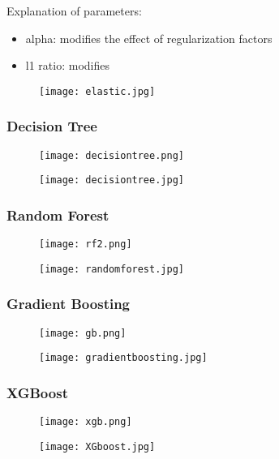 \documentclass[a4paper, 12pt]{article}
\begin{document}
Explanation of parameters:
\begin{itemize}
    \item alpha: modifies the effect of regularization factors
    \item l1 ratio: modifies
\end{itemize}

\begin{figure}[tbh]
    \centering
    \texttt{[image: elastic.jpg]}
\end{figure}
\newpage
\subsubsection{Decision Tree}
\begin{figure}[tbh]
    \centering
    \texttt{[image: decisiontree.png]}
\end{figure}
\begin{figure}[tbh]
    \centering
    \texttt{[image: decisiontree.jpg]}
\end{figure}
\newpage
\subsubsection{Random Forest}
\begin{figure}[tbh]
    \centering
    \texttt{[image: rf2.png]}
\end{figure}
\begin{figure}[tbh]
    \centering
    \texttt{[image: randomforest.jpg]}
\end{figure}
\subsubsection{Gradient Boosting}
\begin{figure}[tbh]
    \centering
    \texttt{[image: gb.png]}
\end{figure}
\begin{figure}[tbh]
    \centering
    \texttt{[image: gradientboosting.jpg]}
\end{figure}
\newpage
\subsubsection{XGBoost} 
\begin{figure}[tbh]
    \centering
    \texttt{[image: xgb.png]}
\end{figure}
\begin{figure}[tbh]
    \centering
    \texttt{[image: XGboost.jpg]}
\end{figure}
\end{document}
